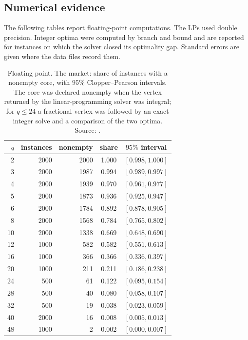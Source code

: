 \subsection{Numerical evidence}\label{sec:discussion-numerics}

The following tables report floating-point computations. The LPs used double precision.
Integer optima were computed by branch and bound and are reported for instances on which
the solver closed its optimality gap. Standard errors are given where the data files record them.

\begin{table}[ht]
\caption{Floating point. The market: share of instances with a nonempty core, with $95\%$
Clopper--Pearson intervals. The core was declared nonempty when the vertex returned by the
linear-programming solver was integral; for $q\le24$ a fractional vertex was followed by an
exact integer solve and a comparison of the two optima. Source:
\protect{}.}\label{tab:discussion-core}
\begin{tabular}{@{}rrrcc@{}}
\toprule
$q$ & instances & nonempty & share & $95\%$ interval \\
\midrule
2 & 2000 & 2000 & 1.000 & $[0.998,1.000]$ \\
3 & 2000 & 1987 & 0.994 & $[0.989,0.997]$ \\
4 & 2000 & 1939 & 0.970 & $[0.961,0.977]$ \\
5 & 2000 & 1873 & 0.936 & $[0.925,0.947]$ \\
6 & 2000 & 1784 & 0.892 & $[0.878,0.905]$ \\
8 & 2000 & 1568 & 0.784 & $[0.765,0.802]$ \\
10 & 2000 & 1338 & 0.669 & $[0.648,0.690]$ \\
12 & 1000 & 582 & 0.582 & $[0.551,0.613]$ \\
16 & 1000 & 366 & 0.366 & $[0.336,0.397]$ \\
20 & 1000 & 211 & 0.211 & $[0.186,0.238]$ \\
24 & 500 & 61 & 0.122 & $[0.095,0.154]$ \\
28 & 500 & 40 & 0.080 & $[0.058,0.107]$ \\
32 & 500 & 19 & 0.038 & $[0.023,0.059]$ \\
40 & 2000 & 16 & 0.008 & $[0.005,0.013]$ \\
48 & 1000 & 2 & 0.002 & $[0.000,0.007]$ \\
\bottomrule
\end{tabular}
\end{table}

